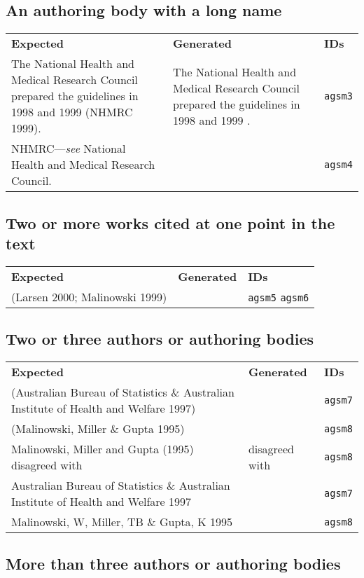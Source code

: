 \documentclass[a4paper,landscape,12pt]{article}
\newlength\q
\newlength\qr
\newenvironment{citetable}
  {\noindent\begin{longtable}{p{\q} p{\q} p{\qr}}\textbf{Expected} & \textbf{Generated} & \textbf{IDs}\\}
  {\end{longtable}}
\begin{document}
\subsection{An authoring body with a long name}

\begin{citetable}
	The National Health and Medical Research Council prepared the guidelines in 1998 and 1999 (NHMRC 1999). & The National Health and Medical Research Council prepared the guidelines in 1998 and 1999 \parencite{agsm3}. & \texttt{agsm3} \\
	NHMRC---\textit{see} National Health and Medical Research Council. & \fullcite{agsm4} & \texttt{agsm4} \\
\end{citetable}

\subsection{Two or more works cited at one point in the text}

\begin{citetable}
	(Larsen 2000; Malinowski 1999) & \parencite{agsm5, agsm6} & \texttt{agsm5} \texttt{agsm6} \\
\end{citetable}

\subsection{Two or three authors or authoring bodies}

\begin{citetable}
	(Australian Bureau of Statistics \& Australian Institute of Health and Welfare 1997) & \parencite{agsm7} & \texttt{agsm7} \\
	(Malinowski, Miller \& Gupta 1995) & \parencite{agsm8} & \texttt{agsm8} \\
	Malinowski, Miller and Gupta (1995) disagreed with & \textcite{agsm8} disagreed with & \texttt{agsm8} \\
	Australian Bureau of Statistics \& Australian Institute of Health and Welfare 1997 & \fullcite{agsm7} & \texttt{agsm7} \\
	Malinowski, W, Miller, TB \& Gupta, K 1995 & \fullcite{agsm8} & \texttt{agsm8} \\
\end{citetable}

\subsection{More than three authors or authoring bodies}
\end{document}
